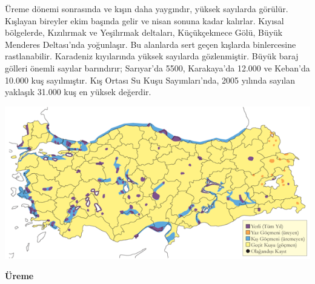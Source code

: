 \documentclass[
  letterpaper,
  DIV=11,
  numbers=noendperiod]{scrreprt}
\begin{document}
Üreme dönemi sonrasında ve kışın daha yaygındır, yüksek sayılarda
görülür. Kışlayan bireyler ekim başında gelir ve nisan sonuna kadar
kalırlar. Kıyısal bölgelerde, Kızılırmak ve Yeşilırmak deltaları,
Küçükçekmece Gölü, Büyük Menderes Deltası'nda yoğunlaşır. Bu alanlarda
sert geçen kışlarda binlercesine rastlanabilir. Karadeniz kıyılarında
yüksek sayılarda gözlenmiştir. Büyük baraj gölleri önemli sayılar
barındırır; Sarıyar'da 5500, Karakaya'da 12.000 ve Keban'da 10.000 kuş
sayılmıştır. Kış Ortası Su Kuşu Sayımları'nda, 2005 yılında sayılan
yaklaşık 31.000 kuş en yüksek değerdir.

\includegraphics{images/harita_Page_053.png}

\textbf{Üreme}
\end{document}
